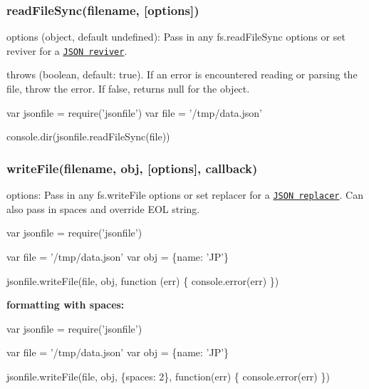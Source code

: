 \subsubsection*{read\+File\+Sync(filename, \mbox{[}options\mbox{]})}

{\ttfamily options} ({\ttfamily object}, default {\ttfamily undefined})\+: Pass in any {\ttfamily fs.\+read\+File\+Sync} options or set {\ttfamily reviver} for a \href{https://developer.mozilla.org/en-US/docs/Web/JavaScript/Reference/Global_Objects/JSON/parse}{\tt J\+S\+ON reviver}.
\begin{DoxyItemize}
\item {\ttfamily throws} ({\ttfamily boolean}, default\+: {\ttfamily true}). If an error is encountered reading or parsing the file, throw the error. If {\ttfamily false}, returns {\ttfamily null} for the object.
\end{DoxyItemize}


\begin{DoxyCode}
var jsonfile = require('jsonfile')
var file = '/tmp/data.json'

console.dir(jsonfile.readFileSync(file))
\end{DoxyCode}


\subsubsection*{write\+File(filename, obj, \mbox{[}options\mbox{]}, callback)}

{\ttfamily options}\+: Pass in any {\ttfamily fs.\+write\+File} options or set {\ttfamily replacer} for a \href{https://developer.mozilla.org/en-US/docs/Web/JavaScript/Reference/Global_Objects/JSON/stringify}{\tt J\+S\+ON replacer}. Can also pass in {\ttfamily spaces} and override {\ttfamily E\+OL} string.


\begin{DoxyCode}
var jsonfile = require('jsonfile')

var file = '/tmp/data.json'
var obj = \{name: 'JP'\}

jsonfile.writeFile(file, obj, function (err) \{
  console.error(err)
\})
\end{DoxyCode}


{\bfseries formatting with spaces\+:}


\begin{DoxyCode}
var jsonfile = require('jsonfile')

var file = '/tmp/data.json'
var obj = \{name: 'JP'\}

jsonfile.writeFile(file, obj, \{spaces: 2\}, function(err) \{
  console.error(err)
\})
\end{DoxyCode}


